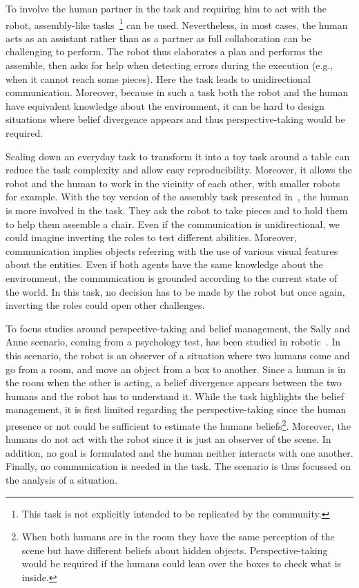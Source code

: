 To involve the human partner in the task and requiring him to act with the robot, assembly-like tasks~\cite{tellex_2014_asking}\footnote{This task is not explicitly intended to be replicated by the community.} can be used. Nevertheless, in most cases, the human acts as an assistant rather than as a partner as full collaboration can be challenging to perform. The robot thus elaborates a plan and performs the assemble, then asks for help when detecting errors during the execution (e.g., when it cannot reach some pieces). Here the task leads to unidirectional communication. Moreover, because in such a task both the robot and the human have equivalent knowledge about the environment, it can be hard to design situations where belief divergence appears and thus perspective-taking would be required.

Scaling down an everyday task to transform it into a toy task around a table can reduce the task complexity and allow easy reproducibility. Moreover, it allows the robot and the human to work in the vicinity of each other, with smaller robots for example. With the toy version of the assembly task presented in~\cite{brawer_2018_situated}, the human is more involved in the task. They ask the robot to take pieces and to hold them to help them assemble a chair. Even if the communication is unidirectional, we could imagine inverting the roles to test different abilities. Moreover, communication implies objects referring with the use of various visual features about the entities. Even if both agents have the same knowledge about the environment, the communication is grounded according to the current state of the world. In this task, no decision has to be made by the robot but once again, inverting the roles could open other challenges.

To focus studies around perspective-taking and belief management, the Sally and Anne scenario, coming from a psychology test, has been studied in robotic~\cite{milliez_2014_framework}. In this scenario, the robot is an observer of a situation where two humans come and go from a room, and move an object from a box to another. Since a human is in the room when the other is acting, a belief divergence appears between the two humans and the robot has to understand it. While the task highlights the belief management, it is first limited regarding the perspective-taking since the human presence or not could be sufficient to estimate the humans beliefs\footnote{When both humans are in the room they have the same perception of the scene but have different beliefs about hidden objects. Perspective-taking would be required if the humans could lean over the boxes to check what is inside.}. Moreover, the humans do not act with the robot since it is just an observer of the scene. In addition, no goal is formulated and the human neither interacts with one another. Finally, no communication is needed in the task. The scenario is thus focussed on the analysis of a situation.

